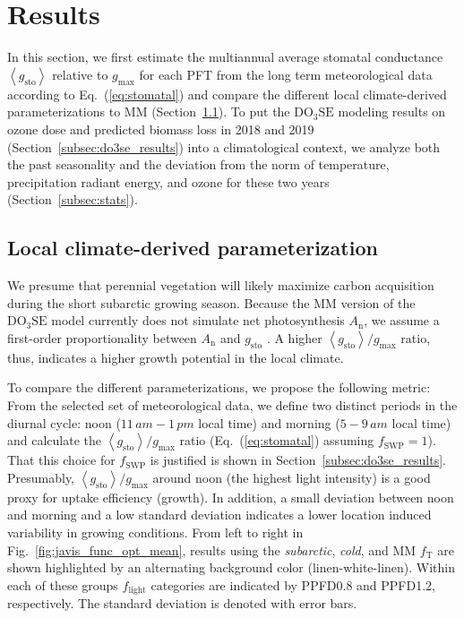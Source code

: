 \documentclass[bg, manuscript]{copernicus}
\begin{document}
\section{Results}
\label{sec:results}
In this section, we first estimate the multiannual average stomatal conductance $\left<g_\mathrm{sto}\right>$ relative to $g_\mathrm{max}$ for each PFT from the long term meteorological data according to Eq.~(\ref{eq:stomatal}) and compare the different local climate-derived parameterizations to MM (Section~\ref{subsec:res_local}). To put the $\mathrm{DO_3SE}$ modeling results on ozone dose and predicted biomass loss in 2018 and 2019 (Section~\ref{subsec:do3se_results}) into a climatological context, we analyze both the past seasonality and the deviation from the norm of temperature, precipitation radiant energy, and ozone for these two years (Section~\ref{subsec:stats}).

\subsection{Local climate-derived parameterization}
\label{subsec:res_local}

We presume that perennial vegetation will likely maximize carbon acquisition during the short subarctic growing season. Because the MM version of the $\mathrm{DO_3SE}$ model currently does not simulate net photosynthesis $A_\mathrm{n}$, we assume a first-order proportionality between $A_\mathrm{n}$ and $g_\mathrm{sto}$ \citep{GCB:Medlyn2011}. A higher $\left<g_\mathrm{sto}\right>/g_\mathrm{max}$ ratio, thus, indicates a higher growth potential in the local climate.

To compare the different parameterizations, we propose the following metric: From the selected set of meteorological data, we define two distinct periods in the diurnal cycle: noon ($11\,\unit{am}-1\,\unit{pm}$ local time) and morning ($5-9\,\unit{am}$ local time) and calculate the $\left<g_\mathrm{sto}\right>/g_\mathrm{max}$ ratio (Eq.~(\ref{eq:stomatal}) assuming $f_\mathrm{SWP}=1$). That this choice for $f_\mathrm{SWP}$ is justified is shown in Section~\ref{subsec:do3se_results}. Presumably, $\left<g_\mathrm{sto}\right>/g_\mathrm{max}$ around noon (the highest light intensity) is a good proxy for  uptake efficiency (growth). In addition, a small deviation between noon and morning and a low standard deviation indicates a lower location induced variability in growing conditions. From left to right in Fig.~\ref{fig:javis_func_opt_mean}, results using the \emph{subarctic}, \emph{cold}, and MM $f_\mathrm{T}$ are shown highlighted by an alternating background color (linen-white-linen). Within each of these groups $f_\mathrm{light}$ categories are indicated by PPFD0.8 and PPFD1.2, respectively. The standard deviation is denoted with error bars. 
\end{document}
